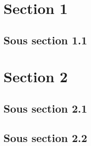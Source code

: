 \section{Section 1}
\lipsum[1-2][1-3]

\subsection{Sous section 1.1}
\lipsum[1-2]

\section{Section 2}
\lipsum[1-2][1-3]

\subsection{Sous section 2.1}
\lipsum[1-2]

\subsection{Sous section 2.2}
\lipsum[1-2][4-6]
